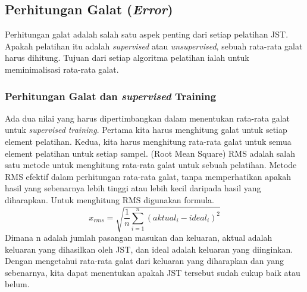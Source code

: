 \subsection{Perhitungan Galat (\textit{Error})}
Perhitungan galat adalah salah satu aspek penting dari setiap pelatihan JST. Apakah pelatihan itu adalah\textit{ supervised }atau \textit{unsupervised}, sebuah rata-rata galat harus dihitung. Tujuan dari setiap algoritma pelatihan ialah untuk meminimalisasi rata-rata galat.
\subsubsection{Perhitungan Galat dan\textit{ supervised }Training}
Ada dua nilai yang harus dipertimbangkan dalam menentukan rata-rata galat untuk\textit{ supervised training}. Pertama kita harus menghitung galat untuk setiap element pelatihan. Kedua, kita harus menghitung rata-rata galat untuk semua element pelatihan untuk setiap sampel. (Root Mean Square) RMS adalah salah satu metode untuk menghitung rata-rata galat untuk sebuah pelatihan. Metode RMS efektif dalam perhitungan rata-rata galat, tanpa memperhatikan apakah hasil yang sebenarnya lebih tinggi atau lebih kecil daripada hasil yang diharapkan. Untuk menghitung RMS digunakan formula. 
\begin{displaymath}
	x_{rms}= \sqrt{\frac{1}{n}\sum_{i=1}^{n}(aktual_{i}-ideal_{i})^2}	
\end{displaymath}
Dimana n adalah jumlah pasangan masukan dan keluaran, aktual adalah keluaran yang dihasilkan oleh JST, dan ideal adalah keluaran yang diinginkan. Dengan mengetahui rata-rata galat dari keluaran yang diharapkan dan yang sebenarnya, kita dapat menentukan apakah JST tersebut sudah cukup baik atau belum.
